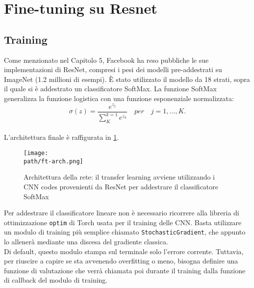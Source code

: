 \section{Fine-tuning su Resnet}
\subsection{Training}
Come menzionato nel Capitolo 5, Facebook ha reso pubbliche le sue implementazioni di ResNet, compresi i pesi dei modelli pre-addestrati su ImageNet (1.2 millioni di esempi). È stato utilizzato il modello da 18 strati, sopra il quale si è addestrato un classificatore SoftMax. La funzione SoftMax\parencite{WSoftmax} generalizza la funzione logistica con una funzione esponenziale normalizzata: 
$$
\sigma(z) = \frac{e^{z_j}}{\sum_{K}^{k=1}e^{z_k}} \quad per \quad j=1,..., K.
$$
\\
L'architettura finale è raffigurata in \ref{fig:arch}. 
\begin{figure}[h!]
 \centering
 \texttt{[image: \\path/ft-arch.png]} 
 \caption{Architettura della rete: il transfer learning avviene utilizzando i CNN codes provenienti da ResNet per addestrare il classificatore SoftMax}
 \label{fig:arch}
\end{figure}
Per addestrare il classificatore lineare non è necessario ricorrere alla libreria di ottimizzazione \texttt{optim} di Torch usata per il training delle CNN. Basta utilizzare un modulo di training più semplice chiamato \texttt{StochasticGradient}, che appunto lo allenerà mediante una discesa del gradiente classica.
\\
Di default, questo modulo stampa sul terminale solo l'errore corrente. Tuttavia, per riuscire a capire se sta avvenendo overfitting o meno, bisogna definire una funzione di valutazione che verrà chiamata poi durante il training dalla funzione di callback del modulo di training.

